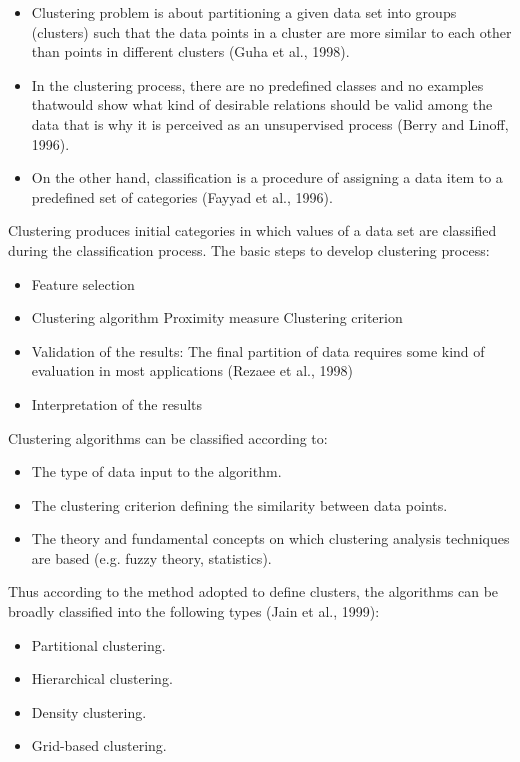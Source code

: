 \documentclass[a4paper,10pt]{article}
\begin{document}
\begin{itemize}
	\item Clustering problem is about partitioning a given data set into groups (clusters) such that the data points in a cluster are more similar to each other than points in different clusters (Guha et al., 1998).
	
	\item In the clustering process, there are no predefined classes and no examples thatwould show what kind of desirable relations should be valid among the data that is why it is perceived as an unsupervised process (Berry and Linoff, 1996).
	
	\item On the other hand, classification is a procedure of assigning a data item to a predefined set of categories (Fayyad et al., 1996).
	
\end{itemize}
Clustering produces initial categories in which values of a data set are classified during the classification process.
The basic steps to develop clustering process:
\begin{itemize}
	\item Feature selection
	\item Clustering algorithm
		\subitem Proximity measure
		\subitem Clustering criterion
	\item Validation of the results: The final partition of data requires some kind of evaluation in most applications (Rezaee et al., 1998)
	\item Interpretation of the results
\end{itemize}
Clustering algorithms can be classified according to:
\begin{itemize}
	\item The type of data input to the algorithm.
	\item The clustering criterion defining the similarity between data points.
	\item The theory and fundamental concepts on which clustering analysis techniques are based (e.g. fuzzy theory, statistics).
\end{itemize}
Thus according to the method adopted to define clusters, the algorithms can be broadly classified into the following types (Jain et al., 1999):
\begin{itemize}
	\item Partitional clustering.
	\item Hierarchical clustering.
	\item Density clustering.
	\item Grid-based clustering.
\end{itemize}
\end{document}
